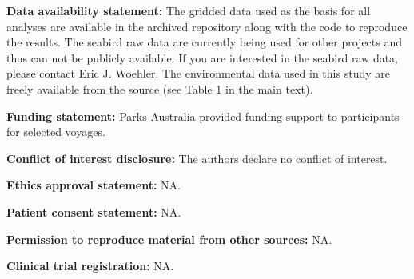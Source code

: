 \documentclass{article}
\begin{document}
\textbf{Data availability statement:} The gridded data used as the basis for all analyses are available in the archived repository along with the code to reproduce the results. The seabird raw data are currently being used for other projects and thus can not be publicly available. If you are interested in the seabird raw data, please contact Eric J. Woehler. The environmental data used in this study are freely available from the source (see Table 1 in the main text).

\textbf{Funding statement:} Parks Australia provided funding support to participants for selected voyages.

\textbf{Conflict of interest disclosure:} The authors declare no conflict of interest.

\textbf{Ethics approval statement:} NA.

\textbf{Patient consent statement:} NA.

\textbf{Permission to reproduce material from other sources:} NA.

\textbf{Clinical trial registration:} NA.

\newpage
\end{document}
